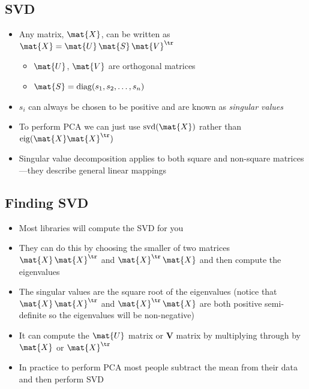 \begin{slide}
\section{SVD}

\begin{PauseHighLight}
  \begin{itemize}
  \item Any matrix, $\mat{X}$, can be written as $\mat{X} =
    \mat{U}\,\mat{S}\,\mat{V}^\tr$
    \begin{itemize}
    \item $\mat{U}$, $\mat{V}$ are orthogonal matrices
    \item $\mat{S} = \mathrm{diag}(s_1, s_2,\ldots,s_n)$\pause
    \end{itemize}
  \item $s_i$ can always be chosen to be positive and are known as
    \emph{singular values}\pause
  \item To perform PCA we can just use $\mathrm{svd}(\mat{X})$ rather
    than $\mathrm{eig}(\mat{X}\mat{X}^\tr)$\pause
  \item Singular value decomposition applies to both square and
    non-square matrices---they describe general linear mappings\pause
  \end{itemize}
\end{PauseHighLight}

\end{slide}





\begin{slide}
\section{Finding SVD}

\begin{PauseHighLight}
  \begin{itemize}
  \item Most libraries will compute the SVD for you\pause
  \item They can do this by choosing the smaller of two matrices
    $\mat{X}\,\mat{X}^\tr$ and $\mat{X}^\tr\,\mat{X}$ and then compute
    the eigenvalues\pause
  \item The singular values are the square root of the eigenvalues
    (notice that $\mat{X}\,\mat{X}^\tr$ and $\mat{X}^\tr\,\mat{X}$ are
    both positive semi-definite so the eigenvalues will be
    non-negative)\pause
  \item It can compute the $\mat{U}$ matrix or $\bm{V}$ matrix by
    multiplying through by $\mat{X}$ or $\mat{X}^\tr$\pause
  \item In practice to perform PCA most people subtract the mean from
    their data and then perform SVD\pause
  \end{itemize}
\end{PauseHighLight}

\end{slide}

